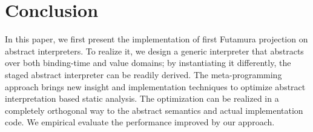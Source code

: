 \section{Conclusion}

In this paper, we first present the implementation of first Futamura projection
on abstract interpreters. To realize it, we design a generic interpreter that
abstracts over both binding-time and value domains; by instantiating it
differently, the staged abstract interpreter can be readily derived.
The meta-programming approach brings new insight and implementation techniques
to optimize abstract interpretation based static analysis. The optimization can
be realized in a completely orthogonal way to the abstract semantics and actual
implementation code. We empirical evaluate the performance improved by our approach.
